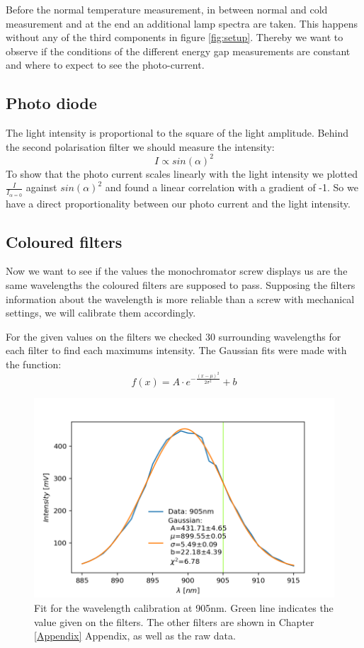 \documentclass[]{article}
\begin{document}
Before the normal temperature measurement, in between normal and cold measurement and at the end an additional lamp spectra are taken. This happens without any of the third components in figure \ref{fig:setup}. Thereby we want to observe if the conditions of the different energy gap measurements are constant and where to expect to see the photo-current. 


\subsection{Photo diode}
The light intensity is proportional to the square of the light amplitude. Behind the second polarisation filter we should measure the intensity:
\begin{equation}
	I \propto sin(\alpha)^2
\end{equation}
To show that the photo current scales linearly with the light intensity we plotted $\frac{I}{I_{\alpha=0}}$ against $sin(\alpha)^2$ and found a linear correlation with a gradient of -1. So we have a direct proportionality between our photo current and the light intensity.

\subsection{Coloured filters} \label{color filters}
Now we want to see if the values the monochromator screw displays us are the same wavelengths the coloured filters are supposed to pass. Supposing the filters information about the wavelength is more reliable than a screw with mechanical settings, we will calibrate them accordingly.

For the given values on the filters we checked 30 surrounding wavelengths for each filter to find each maximums intensity. The Gaussian fits were made with the function:
\begin{equation}
f(x) = A \cdot e^{-\frac{(x-\mu)^2}{2 \sigma^2}} + b
\end{equation}

\begin{figure}[H]
\centering
\includegraphics[width=.9\textwidth]{Plots/905nm-Filter.png}
\caption{Fit for the wavelength calibration at 905nm. Green line indicates the value given on the filters. The other filters are shown in Chapter \ref{Appendix} Appendix, as well as the raw data.}
\end{figure}
\end{document}
